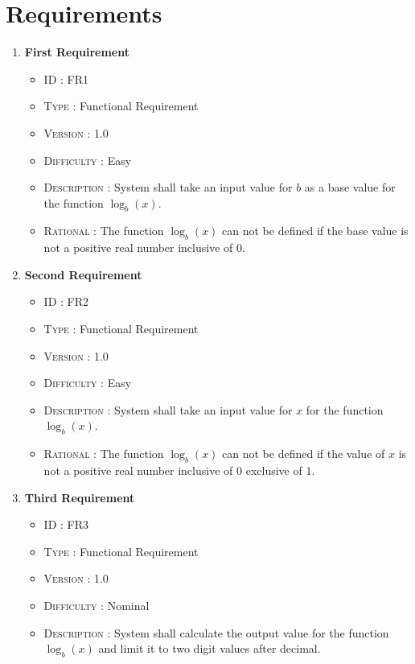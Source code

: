 \documentclass[a4paper, 11pt]{article}
\begin{document}
\section*{Requirements}
    \begin{enumerate}
    \item\textbf{First Requirement}
    \begin{itemize}
        \item \textsc{ID : }FR1
        \item \textsc{Type : }Functional Requirement
        \item \textsc{Version : }1.0
        \item \textsc{Difficulty : }Easy
        \item \textsc{Description : }System shall take an input value for $b$ as a base value for the function $\log _b \left( x \right)$.
        \item \textsc{Rational : }The function $\log _b \left( x \right)$ can not be defined if the base value is not a positive real number inclusive of $0$.
    \end{itemize}
    \item\textbf{Second Requirement}
    \begin{itemize}
        \item \textsc{ID : }FR2
        \item \textsc{Type : }Functional Requirement
        \item \textsc{Version : }1.0
        \item \textsc{Difficulty : }Easy
        \item \textsc{Description : }System shall take an input value for $x$ for the function $\log _b \left( x \right)$.
        \item \textsc{Rational : }The function $\log _b \left( x \right)$ can not be defined if the value of $x$ is not a positive real number inclusive of $0$ exclusive of $1$.
    \end{itemize}
    \item\textbf{Third Requirement}
    \begin{itemize}
        \item \textsc{ID : }FR3
        \item \textsc{Type : }Functional Requirement
        \item \textsc{Version : }1.0
        \item \textsc{Difficulty : }Nominal
        \item \textsc{Description : }System shall calculate the output value for the function $\log _b \left( x \right)$ and limit it to two digit values after decimal.

\end{itemize}
\end{enumerate}
\end{document}
